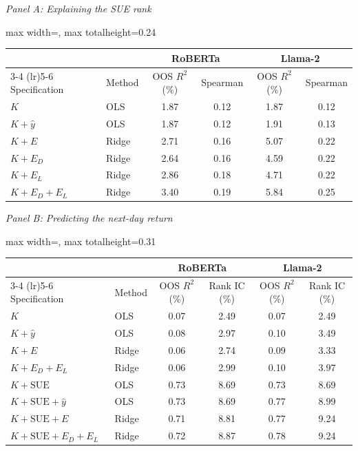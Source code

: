 \begin{table}[htbp]
{\footnotesize
\textit{Panel A: Explaining the SUE rank}\\[2pt]
\begin{adjustbox}{max width=\linewidth, max totalheight=0.24\textheight}
\begin{tabular}{llcccc}
\toprule
\multicolumn{2}{c}{} & \multicolumn{2}{c}{RoBERTa} & \multicolumn{2}{c}{Llama-2} \\
\cmidrule(lr){3-4} \cmidrule(lr){5-6}
Specification & Method & OOS $R^2$ (\%) & Spearman & OOS $R^2$ (\%) & Spearman \\
\midrule
$K$ & OLS & 1.87 & 0.12 & 1.87 & 0.12 \\
$K+\hat y$ & OLS & 1.87 & 0.12 & 1.91 & 0.13 \\
$K+E$ & Ridge & 2.71 & 0.16 & 5.07 & 0.22 \\
$K+E_D$ & Ridge & 2.64 & 0.16 & 4.59 & 0.22 \\
$K+E_L$ & Ridge & 2.86 & 0.18 & 4.71 & 0.22 \\
$K+E_D+E_L$ & Ridge & 3.40 & 0.19 & 5.84 & 0.25 \\
\bottomrule
\end{tabular}
\end{adjustbox}
\par\medskip
\textit{Panel B: Predicting the next-day return}\\[2pt]
\begin{adjustbox}{max width=\linewidth, max totalheight=0.31\textheight}
\begin{tabular}{llcccc}
\toprule
\multicolumn{2}{c}{} & \multicolumn{2}{c}{RoBERTa} & \multicolumn{2}{c}{Llama-2} \\
\cmidrule(lr){3-4} \cmidrule(lr){5-6}
Specification & Method & OOS $R^2$ (\%) & Rank IC (\%) & OOS $R^2$ (\%) & Rank IC (\%) \\
\midrule
$K$ & OLS & 0.07 & 2.49 & 0.07 & 2.49 \\
$K+\hat y$ & OLS & 0.08 & 2.97 & 0.10 & 3.49 \\
$K+E$ & Ridge & 0.06 & 2.74 & 0.09 & 3.33 \\
$K+E_D+E_L$ & Ridge & 0.06 & 2.99 & 0.10 & 3.97 \\
\midrule
$K+\mathrm{SUE}$ & OLS & 0.73 & 8.69 & 0.73 & 8.69 \\
$K+\mathrm{SUE}+\hat y$ & OLS & 0.73 & 8.69 & 0.77 & 8.99 \\
$K+\mathrm{SUE}+E$ & Ridge & 0.71 & 8.81 & 0.77 & 9.24 \\
$K+\mathrm{SUE}+E_D+E_L$ & Ridge & 0.72 & 8.87 & 0.78 & 9.24 \\
\bottomrule
\end{tabular}
\end{adjustbox}
}
\end{table}

